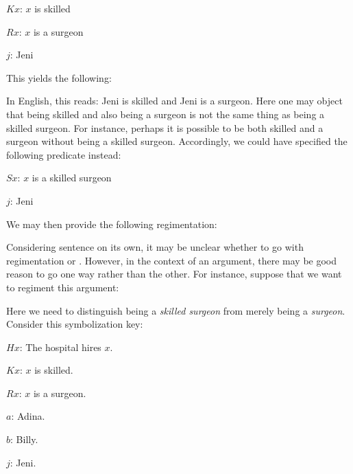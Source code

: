 \begin{ekey}
  \item[$Kx$:] $x$ is skilled
  \item[$Rx$:] $x$ is a surgeon
  \item[$j$:] Jeni
\end{ekey}

This yields the following:

\begin{earg} \label{amb2}
\end{earg}

In English, this reads: Jeni is skilled and Jeni is a surgeon.
Here one may object that being skilled and also being a surgeon is not the same thing as being a skilled surgeon.
For instance, perhaps it is possible to be both skilled and a surgeon without being a skilled surgeon.
Accordingly, we could have specified the following predicate instead:

\begin{ekey}
  \item[$Sx$:] $x$ is a skilled surgeon
  \item[$j$:] Jeni
\end{ekey}

We may then provide the following regimentation:

\begin{earg} \label{amb3}
\end{earg}

Considering sentence  on its own, it may be unclear whether to go with regimentation  or .
However, in the context of an argument, there may be good reason to go one way rather than the other.
For instance, suppose that we want to regiment this argument:

\begin{earg} \label{hospital}
\end{earg}

Here we need to distinguish being a \textit{skilled surgeon} from merely being a \textit{surgeon}.
Consider this symbolization key:

\begin{ekey}
  \begin{multicols}{2}
    \item[$Hx$:] The hospital hires $x$.
    \item[$Kx$:] $x$ is skilled.
    \item[$Rx$:] $x$ is a surgeon.
    \item[$a$:] Adina.
    \item[$b$:] Billy.
    \item[$j$:] Jeni.
  \end{multicols}
\end{ekey}


